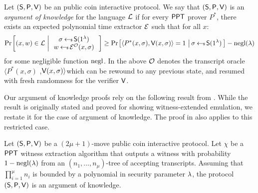 \begin{definition}\label{def:argofknowledge}
Let $(\mathsf{S},\mathsf{P},\mathsf{V})$ be an public coin interactive protocol. We say that
$(\mathsf{S},\mathsf{P},\mathsf{V})$ is an {\em argument of knowledge} for the language
$\mathcal{L}$ if for every $\mathsf{PPT}$
prover $P^\ast$, there exists an expected polynomial time extractor $\mathcal{E}$ such that for all $x$:
\small
\begin{align}
\condprob{(x,w)\in \mc{L}}{
\begin{array}{c}
\sigma\sample\setup(\secparam) \\
w\sample \extr^{\mc{O}}(x,\sigma)
\end{array}
}
\geq \condprob{\langle
P^\ast(x,\sigma),\verifier(x,\sigma)\rangle=1}{\sigma\sample \setup(\secparam)} -
\negl(\lambda)
\end{align}
for some negligible function $\mathrm{negl}$. In the above $\mathcal{O}$ denotes the transcript oracle  $\langle P^\ast(x,\sigma)$ ,$\mathsf{V}(x,\sigma)\rangle$which can be rewound to any previous state, and resumed with fresh randomness for the
verifier $\mathsf{V}$.
\end{definition}

Our argument of knowledge proofs rely on the following result from \cite{bulletproofs}.
While the result is originally stated and proved for showing witness-extended
emulation, we restate it for the case of argument of knowledge. The proof in
\cite{InnerProductDLS} also applies to this restricted case.

\begin{lemma}\label{lem:forkinglemma}
Let $(\mathsf{S},\mathsf{P},\mathsf{V})$ be a $(2\mu+1)$-move public coin interactive
protocol. Let $\chi$ be a $\mathsf{PPT}$ witness extraction algorithm that outputs a
witness with probability $1-\mathrm{negl}(\lambda)$ from an $(n_1,\ldots,n_\mu)$-tree
of accepting transcripts. Assuming that $\prod_{i=1}^\mu n_i$ is bounded by a
polynomial in security parameter $\lambda$, the protocol
$(\mathsf{S},\mathsf{P},\mathsf{V})$ is an argument of knowledge.
\end{lemma}

